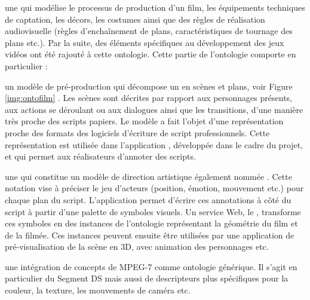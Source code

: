\begin{listeni}
	\item une  qui modélise le processus de production d'un film, les équipements techniques de captation, les décors, les costumes ainsi que des règles de réalisation audiovisuelle (règles d'enchaînement de plans, caractéristiques de tournage des plans etc.).
	Par la suite, des éléments spécifiques au développement des jeux vidéos ont été rajouté à cette ontologie.
	Cette partie de l'ontologie comporte en particulier : 

	\begin{liste}
		\item un modèle de pré-production qui décompose un  en scènes et plans, voir Figure \ref{img:ontofilm} .
		Les scènes sont décrites par rapport aux personnages présents, aux actions se déroulant ou aux dialogues ainsi que les transitions, d'une manière très proche des scripts papiers.
		Le modèle a fait l'objet d'une représentation proche des formats des logiciels d'écriture de script professionnels.  
		Cette représentation est utilisée dans l'application , développée dans le cadre du projet, et qui permet aux réalisateurs d'annoter des scripts.\\
	\end{liste}

	\item une  qui constitue un modèle de direction artistique également nommée  . 
	Cette notation vise à préciser le jeu d'acteurs (position, émotion, mouvement etc.) pour chaque plan du script. 
	L'application  permet d'écrire ces annotations à côté du script à partir d'une palette de symboles visuels. 
	Un service Web, le , transforme ces symboles en des instances de l'ontologie représentant la géométrie du film et de la  filmée.
	Ces instances peuvent ensuite être utilisées par une application de pré-visualisation de la scène en 3D, avec animation des personnages etc.

	\item une intégration de concepts de MPEG-7 comme ontologie générique. 
	Il s'agit en particulier du Segment DS mais aussi de descripteurs plus spécifiques pour la couleur, la texture, les mouvements de caméra etc.
\end{listeni}


